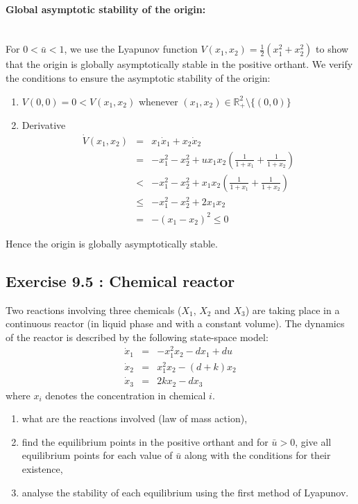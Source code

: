 \paragraph{Global asymptotic stability of the origin: }~\\
For $0<\bar{u}<1$, we use the Lyapunov function $V(x_1,x_2)=\frac{1}{2}(x_1^2+x_2^2)$ to show that the origin is globally asymptotically stable in the positive orthant. We verify the conditions to ensure the asymptotic stability of the origin:
\begin{enumerate}
\item $V(0,0)=0<V(x_1,x_2)$ whenever $(x_1,x_2)\in\mathbb{R}^2_+\setminus\{(0,0)\}$
\item Derivative
$$
\begin{array}{rcl}
\dot{V}(x_1,x_2) &=& x_1\dot{x}_1+x_2\dot{x}_2\\
&=& -x_1^2-x_2^2+ux_1x_2(\frac{1}{1+x_1}+\frac{1}{1+x_2})\\
&<& -x_1^2-x_2^2+x_1x_2(\frac{1}{1+x_1}+\frac{1}{1+x_2})\\
&\leq& -x_1^2-x_2^2+2x_1x_2\\
&=& -(x_1-x_2)^2\leq 0
\end{array}
$$
\end{enumerate}
Hence the origin is globally asymptotically stable.

\subsection*{Exercise 9.5 : Chemical reactor}
Two reactions involving three chemicals ($X_1$, $X_2$ and $X_3$) are taking place in a continuous reactor (in liquid phase and with a constant volume). The dynamics of the reactor is described by the following state-space model:
$$
\begin{array}{rcl}
\dot{x}_1 &=& -x_1^2x_2-dx_1+du\\
\dot{x}_2 &=& x_1^2x_2-(d+k)x_2\\
\dot{x}_3 &=& 2kx_2-dx_3
\end{array}
$$
where $x_i$ denotes the concentration in chemical $i$.
\begin{enumerate}
\item what are the reactions involved (law of mass action),
\item find the equilibrium points in the positive orthant and for $\bar{u}>0$, give all equilibrium points for each value of $\bar{u}$ along with the conditions for their existence,
\item analyse the stability of each equilibrium using the first method of Lyapunov.
\end{enumerate}

